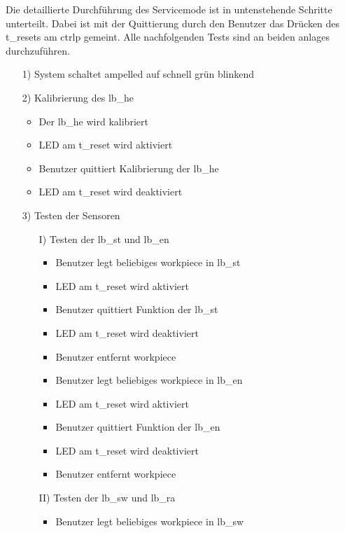 Die detaillierte Durchführung des Servicemode ist in untenstehende Schritte unterteilt. Dabei ist mit der Quittierung
durch den Benutzer das Drücken des \gls{t_reset}s am \gls{ctrlp} gemeint. Alle nachfolgenden Tests sind an beiden
\glspl{anlage} durchzuführen.
\begin{enumerate}
    \item[1)] System schaltet \gls{ampelled} auf schnell grün blinkend
    \item[2)] Kalibrierung des \gls{lb_he}
    \begin{itemize}
        \item Der \gls{lb_he} wird kalibriert
        \item LED am \gls{t_reset} wird aktiviert
        \item Benutzer quittiert Kalibrierung der \gls{lb_he}
        \item LED am \gls{t_reset} wird deaktiviert
    \end{itemize}
    \item[3)] Testen der Sensoren
    \begin{enumerate}
        \item[I)] Testen der \gls{lb_st} und \gls{lb_en}
        \begin{itemize}
            \item Benutzer legt beliebiges \gls{workpiece} in \gls{lb_st}
            \item LED am \gls{t_reset} wird aktiviert
            \item Benutzer quittiert Funktion der \gls{lb_st}
            \item LED am \gls{t_reset} wird deaktiviert
            \item Benutzer entfernt \gls{workpiece}
            \item Benutzer legt beliebiges \gls{workpiece} in \gls{lb_en}
            \item LED am \gls{t_reset} wird aktiviert
            \item Benutzer quittiert Funktion der \gls{lb_en}
            \item LED am \gls{t_reset} wird deaktiviert
            \item Benutzer entfernt \gls{workpiece}
        \end{itemize}
        \item[II)] Testen der \gls{lb_sw} und \gls{lb_ra}
        \begin{itemize}
            \item Benutzer legt beliebiges \gls{workpiece} in \gls{lb_sw}

\end{itemize}
\end{enumerate}
\end{enumerate}
